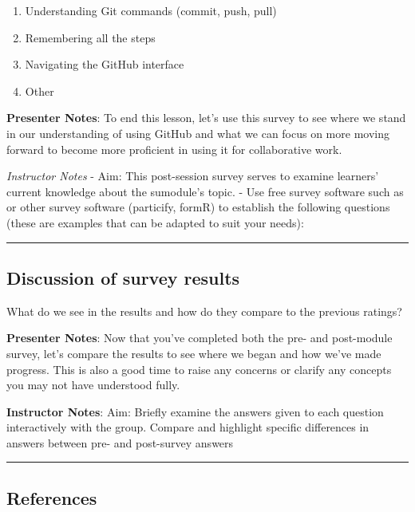 \documentclass[
  letterpaper,
  DIV=11,
  numbers=noendperiod]{scrartcl}
\begin{document}
\begin{enumerate}
\def\labelenumi{\alph{enumi}.}
\item
  Understanding Git commands (commit, push, pull)
\item
  Remembering all the steps
\item
  Navigating the GitHub interface
\item
  Other
\end{enumerate}

\textbf{Presenter Notes}: To end this lesson, let's use this survey to
see where we stand in our understanding of using GitHub and what we can
focus on more moving forward to become more proficient in using it for
collaborative work.

\emph{Instructor Notes} - Aim: This post-session survey serves to
examine learners' current knowledge about the sumodule's topic. - Use
free survey software such as or other survey software (particify, formR)
to establish the following questions (these are examples that can be
adapted to suit your needs):

\begin{center}\rule{0.5\linewidth}{0.5pt}\end{center}

\subsection{Discussion of survey
results}\label{discussion-of-survey-results-1}

What do we see in the results and how do they compare to the previous
ratings?

\textbf{Presenter Notes}: Now that you've completed both the pre- and
post-module survey, let's compare the results to see where we began and
how we've made progress. This is also a good time to raise any concerns
or clarify any concepts you may not have understood fully.

\textbf{Instructor Notes}: Aim: Briefly examine the answers given to
each question interactively with the group. Compare and highlight
specific differences in answers between pre- and post-survey answers

\begin{center}\rule{0.5\linewidth}{0.5pt}\end{center}

\subsection{References}\label{references}
\end{document}
